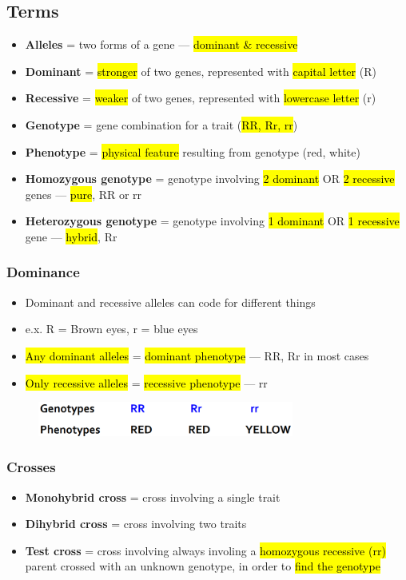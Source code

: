 \documentclass[a4paper,12pt]{article}
\begin{document}
\subsection{Terms}
\begin{itemize}
    \item{\textbf{Alleles} = two forms of a gene --- \hl{dominant \& recessive}}
    \item{\textbf{Dominant} = \hl{stronger} of two genes, represented with \hl{capital letter} (R)}
    \item{\textbf{Recessive} = \hl{weaker} of two genes, represented with \hl{lowercase letter} (r)}
    \item{\textbf{Genotype} = gene combination for a trait (\hl{RR, Rr, rr})}
    \item{\textbf{Phenotype} = \hl{physical feature} resulting from genotype (red, white)}
    \item{\textbf{Homozygous genotype} = genotype involving \hl{2 dominant} OR \hl{2 recessive} genes --- \hl{pure}, RR or rr}
    \item{\textbf{Heterozygous genotype} = genotype involving \hl{1 dominant} OR \hl{1 recessive} gene --- \hl{hybrid}, Rr}
\end{itemize}

\pagebreak

\subsubsection{Dominance}
\begin{itemize}
    \item{Dominant and recessive alleles can code for different things}
    \item{e.x. R = Brown eyes, r = blue eyes}
    \item{\hl{Any dominant alleles} = \hl{dominant phenotype} --- RR, Rr in most cases}
    \item{\hl{Only recessive alleles} = \hl{recessive phenotype} --- rr}
\end{itemize}

\begin{figure}[H]
    \centering
    \includegraphics[width=0.75\textwidth]{dom}
\end{figure}

\subsubsection{Crosses}
\begin{itemize}
    \item{\textbf{Monohybrid cross} = cross involving a single trait}
    \item{\textbf{Dihybrid cross} = cross involving two traits}
    \item{\textbf{Test cross} = cross involving always involing a \hl{homozygous recessive (rr)} parent crossed with an unknown genotype, in order to \hl{find the genotype}}
\end{itemize}
\end{document}
